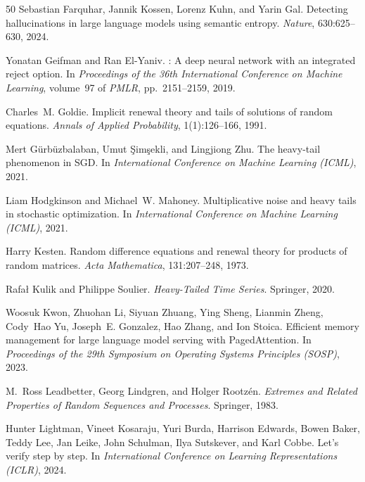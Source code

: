 \begin{thebibliography}{50}
Sebastian Farquhar, Jannik Kossen, Lorenz Kuhn, and Yarin Gal.
\newblock Detecting hallucinations in large language models using semantic entropy.
\newblock \emph{Nature}, 630:625--630, 2024.

Yonatan Geifman and Ran El-Yaniv.
: A deep neural network with an integrated reject option.
\newblock In \emph{Proceedings of the 36th International Conference on Machine Learning}, volume~97 of \emph{PMLR}, pp.\ 2151--2159, 2019.

Charles~M. Goldie.
\newblock Implicit renewal theory and tails of solutions of random equations.
\newblock \emph{Annals of Applied Probability}, 1(1):126--166, 1991.

Mert G{\"u}rb{\"u}zbalaban, Umut {\c{S}}im{\c{s}}ekli, and Lingjiong Zhu.
\newblock The heavy-tail phenomenon in {SGD}.
\newblock In \emph{International Conference on Machine Learning (ICML)}, 2021.

Liam Hodgkinson and Michael~W. Mahoney.
\newblock Multiplicative noise and heavy tails in stochastic optimization.
\newblock In \emph{International Conference on Machine Learning (ICML)}, 2021.

Harry Kesten.
\newblock Random difference equations and renewal theory for products of random matrices.
\newblock \emph{Acta Mathematica}, 131:207--248, 1973.

Rafa{\l} Kulik and Philippe Soulier.
\newblock \emph{Heavy-Tailed Time Series}.
\newblock Springer, 2020.

Woosuk Kwon, Zhuohan Li, Siyuan Zhuang, Ying Sheng, Lianmin Zheng, Cody~Hao Yu, Joseph~E. Gonzalez, Hao Zhang, and Ion Stoica.
\newblock Efficient memory management for large language model serving with {PagedAttention}.
\newblock In \emph{Proceedings of the 29th Symposium on Operating Systems Principles (SOSP)}, 2023.

M.~Ross Leadbetter, Georg Lindgren, and Holger Rootz{\'e}n.
\newblock \emph{Extremes and Related Properties of Random Sequences and Processes}.
\newblock Springer, 1983.

Hunter Lightman, Vineet Kosaraju, Yuri Burda, Harrison Edwards, Bowen Baker, Teddy Lee, Jan Leike, John Schulman, Ilya Sutskever, and Karl Cobbe.
\newblock Let's verify step by step.
\newblock In \emph{International Conference on Learning Representations (ICLR)}, 2024.


\end{thebibliography}
